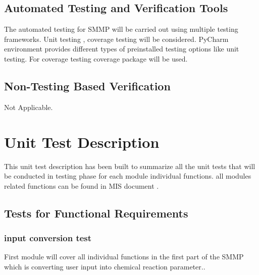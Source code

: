 \documentclass[12pt, titlepage]{article}
\begin{document}
\subsection{Automated Testing and Verification Tools}

The automated testing for SMMP will be carried out using multiple testing frameworks. Unit testing , coverage testing will be considered. PyCharm environment provides different types of preinstalled testing options like unit testing. For coverage testing coverage package will be used.



\subsection{Non-Testing Based Verification}

Not Applicable. 


\section{Unit Test Description}

This unit test description has been built to summarize all the unit tests that will be conducted in testing phase for each module individual functions. all modules related functions can be found in MIS document .

\subsection{Tests for Functional Requirements}

\subsubsection{input conversion test}

 First module will cover all individual functions in the first part of the SMMP which is converting user input into chemical reaction parameter.. 
\end{document}
